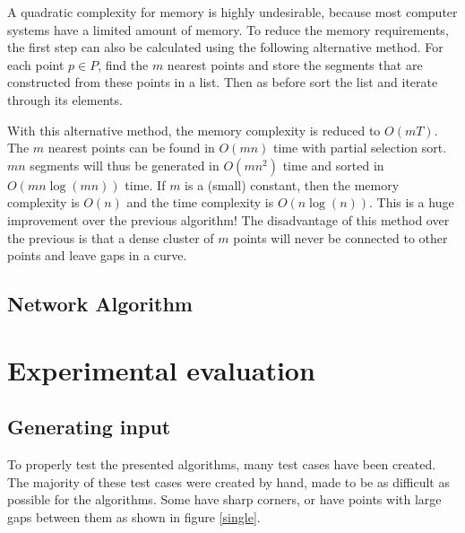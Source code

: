 \documentclass[11pt]{article}
\begin{document}
A quadratic complexity for memory is highly undesirable, because most computer systems have a limited amount of memory. To reduce the memory requirements, the first step can also be calculated using the following alternative method. For each point $p \in P$, find the $m$ nearest points and store the segments that are constructed from these points in a list. Then as before sort the list and iterate through its elements.

With this alternative method, the memory complexity is reduced to $O(mT)$. The $m$ nearest points can be found in $O(mn)$ time with partial selection sort.
 $mn$ segments will thus be generated in $O(mn^2)$ time and sorted in $O(mn\log(mn))$ time. If $m$ is a (small) constant, then the memory complexity is $O(n)$ and the time complexity is $O(n\log(n))$. This is a huge improvement over the previous algorithm! The disadvantage of this method over the previous is that a dense cluster of $m$ points will never be connected to other points and leave gaps in a curve.


\subsection{Network Algorithm}

\section{Experimental evaluation}
\subsection{Generating input}
To properly test the presented algorithms, many test cases have been created. The majority of these test cases were created by hand, made to be as difficult as possible for the algorithms. Some have sharp corners, or have points with large gaps between them as shown in figure \ref{single}.
\end{document}
